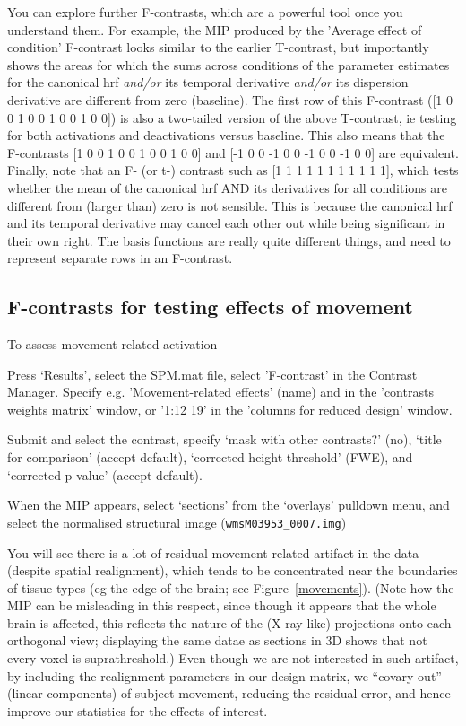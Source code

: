 You can explore further F-contrasts, which are a powerful tool once you understand them. For example, the MIP produced by the 'Average effect of condition' F-contrast looks similar to the earlier T-contrast, but importantly shows the areas for which the sums across conditions of the parameter estimates for the canonical hrf {\em and/or} its temporal derivative {\em and/or} its dispersion derivative are different from zero (baseline). The first row of this F-contrast ([1 0 0 1 0 0 1 0 0 1 0 0]) is also a two-tailed version of the above T-contrast, ie testing for both activations and deactivations versus baseline. This also means that the F-contrasts [1 0 0 1 0 0 1 0 0 1 0 0] and [-1 0 0 -1 0 0 -1 0 0 -1 0 0] are equivalent. Finally, note that an F- (or t-) contrast such as [1 1 1 1 1 1 1 1 1 1 1], which tests whether the mean of the canonical hrf AND its derivatives for all conditions are different from (larger than) zero is not sensible. This is because the canonical hrf and its temporal derivative may cancel each other out while being significant in their own right. The basis functions are really quite different things, and need to represent separate rows in an F-contrast. 


\subsection{F-contrasts for testing effects of movement}

To assess movement-related activation
\bi
\item{Press `Results', select the SPM.mat file, select 'F-contrast' in the Contrast Manager. Specify e.g. 'Movement-related effects' (name) and 
in the 'contrasts weights matrix' window, or '1:12 19' in the 'columns for reduced design' window.} 
\item{
Submit and select the contrast, specify `mask with other contrasts?' (no), `title for comparison' (accept default), `corrected height threshold' (FWE), and `corrected p-value' (accept default).}
 \item{When the MIP appears, select `sections' from the `overlays' pulldown
 menu, and select the normalised structural image (\verb!wmsM03953_0007.img!)}
 \ei

You will see there is a lot of residual movement-related artifact in the data (despite spatial realignment), which tends to be concentrated near the boundaries of tissue types (eg the edge of the brain; see Figure~\ref{movements}). (Note how the MIP can be misleading in this respect, since though it appears that the whole brain is affected, this reflects the nature of the (X-ray like) projections onto each orthogonal view; displaying the same datae as sections in 3D shows that not every voxel is suprathreshold.)  Even though we are not interested in such artifact, by including the realignment parameters in our design matrix, we ``covary out'' (linear components) of subject movement, reducing the residual error, and hence improve our statistics for the effects of interest.

